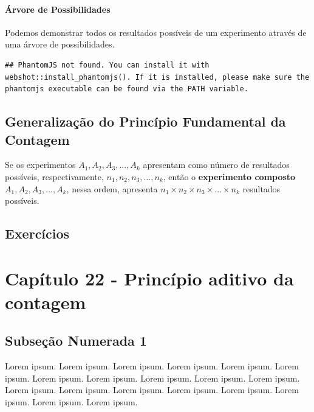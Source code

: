 \documentclass[
]{book}
\begin{document}
\hypertarget{uxe1rvore-de-possibilidades}{%
\paragraph{Árvore de Possibilidades}\label{uxe1rvore-de-possibilidades}}

Podemos demonstrar todos os resultados possíveis de um experimento através de uma árvore de possibilidades.

\begin{verbatim}
## PhantomJS not found. You can install it with webshot::install_phantomjs(). If it is installed, please make sure the phantomjs executable can be found via the PATH variable.
\end{verbatim}

\hypertarget{generalizauxe7uxe3o-do-princuxedpio-fundamental-da-contagem}{%
\subsection{Generalização do Princípio Fundamental da Contagem}\label{generalizauxe7uxe3o-do-princuxedpio-fundamental-da-contagem}}

Se os experimentos \(A_{1}, A_{2}, A_{3}, ..., A_{k}\) apresentam como número de resultados possíveis, respectivamente, \(n_{1}, n_{2}, n_{3}, ..., n_{k}\), então o \textbf{experimento composto} \(A_{1}, A_{2}, A_{3}, ..., A_{k}\), nessa ordem, apresenta \(n_{1} \times n_{2} \times n_{3} \times ... \times n_{k}\) resultados possíveis.

\hypertarget{exercuxedcios}{%
\subsection*{Exercícios}\label{exercuxedcios}}

\hypertarget{capuxedtulo-22---princuxedpio-aditivo-da-contagem}{%
\section{Capítulo 22 - Princípio aditivo da contagem}\label{capuxedtulo-22---princuxedpio-aditivo-da-contagem}}

\hypertarget{subseuxe7uxe3o-numerada-1}{%
\subsection{Subseção Numerada 1}\label{subseuxe7uxe3o-numerada-1}}

Lorem ipsum. Lorem ipsum. Lorem ipsum. Lorem ipsum. Lorem ipsum. Lorem ipsum. Lorem ipsum. Lorem ipsum. Lorem ipsum. Lorem ipsum. Lorem ipsum. Lorem ipsum. Lorem ipsum. Lorem ipsum. Lorem ipsum. Lorem ipsum. Lorem ipsum. Lorem ipsum. Lorem ipsum.
\end{document}

